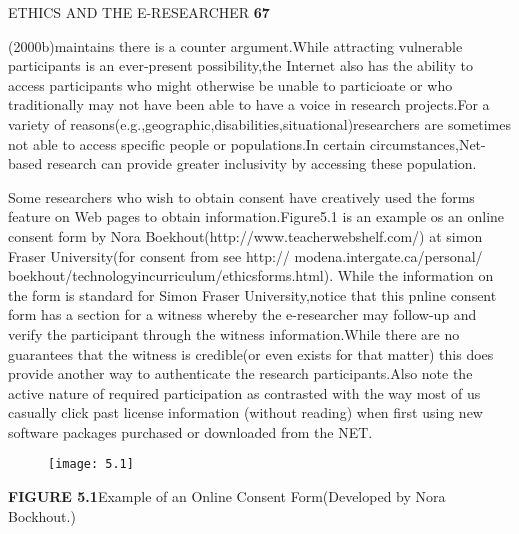 \documentclass[10pt,a4paper]{book}
\begin{document}
\begin{flushright}
  ETHICS AND THE E-RESEARCHER \quad \textbf{67}
\end{flushright}

\!\!\!\!\!\!\!\!\!\!(2000b)maintains there is a counter argument.While attracting vulnerable participants is an ever-present possibility,the Internet also has the ability to access participants who might otherwise be unable to particioate or who traditionally may not have been able to have a voice in research projects.For a variety of reasons(e.g.,geographic,disabilities,situational)researchers are sometimes not able to access specific people or populations.In certain circumstances,Net-based research can provide greater inclusivity by accessing these population.

Some researchers who wish to obtain consent have creatively used the forms feature on Web pages to obtain information.Figure5.1 is an example os an online consent form by Nora Boekhout(http://www.teacherwebshelf.com/) at simon Fraser University(for consent from see http:// modena.intergate.ca/personal/ boekhout/technologyincurriculum/ethicsforms.html). While the information on the form is standard for Simon Fraser University,notice that this pnline consent form has a section for a witness whereby the e-researcher may follow-up and verify the participant through the witness information.While there are no guarantees that the witness is credible(or even exists for that matter) this does provide another way to authenticate the research participants.Also note the active nature of required participation as contrasted with the way most of us casually click past license information (without reading) when first using new software packages purchased or downloaded from the NET.

\begin{figure}[h]
  \centering
  \texttt{[image: 5.1]}\\
\end{figure}
\footnotesize\textbf{\!\!\!\!\!\!\!FIGURE 5.1}\quad Example of an Online Consent Form(Developed by Nora Bockhout.)
\end{document}
